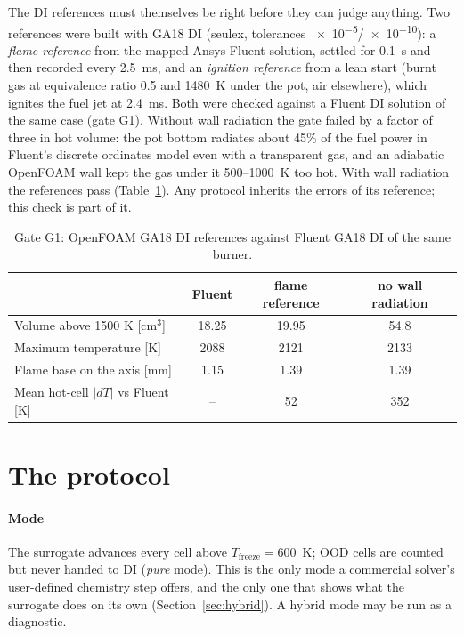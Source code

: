 \documentclass[preprint,review,12pt]{elsarticle}
\begin{document}
The DI references must themselves be right before they can judge anything. Two references were built with GA18
DI (seulex, tolerances \num{e-5}/\num{e-10}): a \emph{flame reference} from the mapped Ansys Fluent solution,
settled for 0.1~s and then recorded every 2.5~ms, and an \emph{ignition reference} from a lean start (burnt gas
at equivalence ratio 0.5 and 1480~K under the pot, air elsewhere), which ignites the fuel jet at 2.4~ms. Both
were checked against a Fluent DI solution of the same case (gate G1). Without wall radiation the gate failed by
a factor of three in hot volume: the pot bottom radiates about 45\% of the fuel power in Fluent's discrete
ordinates model even with a transparent gas, and an adiabatic OpenFOAM wall kept the gas under it 500--1000~K
too hot. With wall radiation the references pass (Table~\ref{tab:g1}). Any protocol inherits the errors of its
reference; this check is part of it.

\begin{table}[t]
\centering
\caption{Gate G1: OpenFOAM GA18 DI references against Fluent GA18 DI of the same burner.}
\label{tab:g1}
\small
\begin{tabular}{lccc}
\toprule
 & Fluent & flame reference & no wall radiation \\
\midrule
Volume above 1500 K [cm$^3$]  & 18.25 & 19.95 & 54.8 \\
Maximum temperature [K]       & 2088  & 2121  & 2133 \\
Flame base on the axis [mm]   & 1.15  & 1.39  & 1.39 \\
Mean hot-cell $|dT|$ vs Fluent [K] & -- & 52 & 352 \\
\bottomrule
\end{tabular}
\end{table}

\section{The protocol}
\label{sec:protocol}
\paragraph{Mode} The surrogate advances every cell above $T_\mathrm{freeze}=600$~K; OOD cells are counted but
never handed to DI (\emph{pure} mode). This is the only mode a commercial solver's user-defined chemistry step
offers, and the only one that shows what the surrogate does on its own (Section~\ref{sec:hybrid}). A hybrid mode
may be run as a diagnostic.
\end{document}
